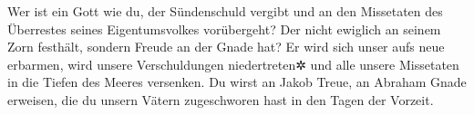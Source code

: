 Wer ist ein Gott wie du, der Sündenschuld vergibt und an
den Missetaten des Überrestes seines Eigentumsvolkes vorübergeht? Der
nicht ewiglich an seinem Zorn festhält, sondern Freude an der Gnade hat?
Er wird sich unser aufs neue erbarmen, wird unsere
Verschuldungen niedertreten✲ und alle unsere Missetaten in die Tiefen
des Meeres versenken. Du wirst an Jakob Treue, an Abraham
Gnade erweisen, die du unsern Vätern zugeschworen hast in den Tagen der
Vorzeit.
